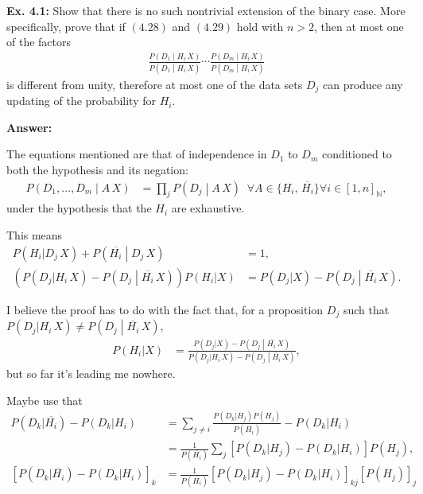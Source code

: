 \documentclass{article}
\begin{document}
\textbf{Ex. 4.1: }Show that there is no such nontrivial extension of the binary case. More specifically, prove that if $(4.28)$ and $(4.29)$ hold with $n>2$, then at most one of the factors
\begin{align*}
	\frac{P\left(D_1\middle|H_i\,X\right)}{P\left(D_1\middle|\overline{H_i}\,X\right)}\cdots\frac{P\left(D_m\middle|H_i\,X\right)}{P\left(D_m\middle|\overline{H_i}\,X\right)}
\end{align*}
is different from unity, therefore at most one of the data sets $D_j$ can produce any updating of the probability for $H_i$.

\textbf{Answer:}

The equations mentioned are that of independence in $D_1$ to $D_m$ conditioned to both the hypothesis and its negation:
\begin{align*}
	P\left(D_1,\ldots,D_m\middle|A\,X\right)&=\prod_jP\left(D_j\middle|A\,X\right)\;\;\forall A\in\{H_i,\,\overline{H_i}\}\forall i\in[1,n]_{\mathbb N},
\end{align*}
under the hypothesis that the $H_i$ are exhaustive.

This means
\begin{align*}
	P(H_i|D_j\,X)+P\left(\overline{H_i}\middle|D_j\,X\right)&=1,\\
	\left(P(D_j|H_i\,X)-P\left(D_j\middle|\overline{H_i}\,X\right)\right)P(H_i|X)&=P(D_j|X)-P\left(D_j\middle|\overline{H_i}\,X\right).
\end{align*}

I believe the proof has to do with the fact that, for a proposition $D_j$ such that $P(D_j|H_i\,X)\neq P\left(D_j\middle|\overline{H_i}\,X\right)$,
\begin{align*}
	P(H_i|X)&=\frac{P(D_j|X)-P\left(D_j\middle|\overline{H_i}\,X\right)}{P(D_j|H_i\,X)-P\left(D_j\middle|\overline{H_i}\,X\right)},
\end{align*}
but so far it's leading me nowhere.

Maybe use that
\begin{align*}
	P(D_k|\overline{H_i})-P(D_k|H_i)&=\sum_{j\neq i}\frac{P(D_k|H_j)P(H_j)}{P(\overline{H_i})}-P(D_k|H_i)\\
	&=\frac1{P(\overline{H_i})}\sum_j\left[P(D_k|H_j)-P(D_k|H_i)\right]P(H_j),\\
	\left[P(D_k|\overline{H_i})-P(D_k|H_i)\right]_k&=\frac1{P(\overline{H_i})}\left[P(D_k|H_j)-P(D_k|H_i)\right]_{kj}\left[P(H_j)\right]_j
\end{align*}

\end{document}
